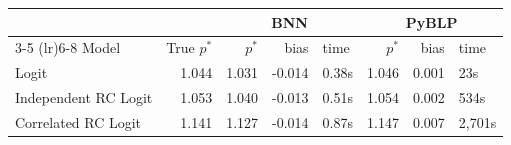 \begin{tabular}{lrrrlrrl}
\toprule
 & & \multicolumn{3}{c}{BNN} & \multicolumn{3}{c}{PyBLP} \\
\cmidrule(lr){3-5} \cmidrule(lr){6-8}
Model & True $p^*$ & $p^*$ & bias & time & $p^*$ & bias & time \\
\midrule
Logit & 1.044 & 1.031 & -0.014 & 0.38s & 1.046 & 0.001 & 23s \\
Independent RC Logit & 1.053 & 1.040 & -0.013 & 0.51s & 1.054 & 0.002 & 534s \\
Correlated RC Logit & 1.141 & 1.127 & -0.014 & 0.87s & 1.147 & 0.007 & 2{,}701s \\
\bottomrule
\end{tabular}
